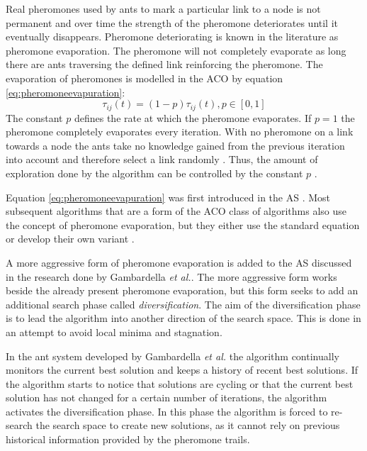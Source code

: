 Real pheromones used by ants to mark a particular link to a node is not permanent and over time the strength of the pheromone deteriorates until it eventually disappears\cite{CompuIntelligenceIntro}. Pheromone deteriorating is known in the literature as pheromone evaporation\cite{CompuIntelligenceIntro}. The pheromone will not completely evaporate as long there are ants traversing the defined link reinforcing the pheromone. The evaporation of pheromones is modelled in the \gls{ACO} by equation \ref{eq:pheromoneevapuration}\cite{AntIntroTrends,ACOSurvey}:
\begin{equation}
\label{eq:pheromoneevapuration}
	\tau_{ij}(t) = (1-p)\tau_{ij}(t), p\in [0,1]
\end{equation}
The constant $p$ defines the rate at which the pheromone evaporates. If $p=1$ the pheromone completely evaporates every iteration. With no pheromone on a link towards a node the ants take no knowledge gained from the previous iteration into account and therefore select a link randomly \cite{CompuIntelligenceIntro,AntsAndStigmergy}. Thus, the amount of exploration done by the algorithm can be controlled by the constant $p$ \cite{CompuIntelligenceIntro,AntsAndStigmergy}.

Equation \ref{eq:pheromoneevapuration} was first introduced in the \gls{AS} \cite{CompuIntelligenceIntro,ACOSurvey}. Most subsequent algorithms that are a form of the \gls{ACO} class of algorithms also use the concept of pheromone evaporation, but they either use the standard equation or develop their own variant \cite{CompuIntelligenceIntro,AntsAndStigmergy}.

A more aggressive form of pheromone evaporation  is added to the \gls{AS} discussed in the research done by Gambardella \emph{et al.}\cite{AntQAP}. The more aggressive form works beside the already present pheromone evaporation, but this form seeks to add an additional search phase called \emph{diversification}\cite{AntQAP}. The aim of the diversification phase is to lead the algorithm into another direction of the search space\cite{AntQAP}. This is done in an attempt to avoid local minima and stagnation\cite{AntQAP}.

In the ant system developed by Gambardella \emph{et al.} the algorithm continually monitors the current best solution and keeps a history of recent best solutions\cite{AntQAP}. If the algorithm starts to notice that solutions are cycling or that the current best solution has not changed for a certain number of iterations, the algorithm activates the diversification phase\cite{AntQAP}. In this phase the algorithm is forced to re-search the search space to create new solutions, as it cannot rely on previous historical information provided by the pheromone trails\cite{AntQAP}.

